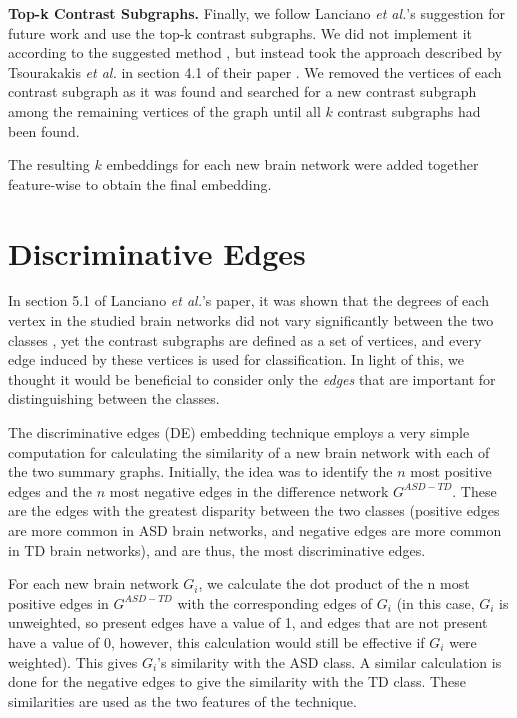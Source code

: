 \documentclass[sigconf]{acmart}
\begin{document}
\textbf{Top-k Contrast Subgraphs.}
Finally, we follow Lanciano \emph{et al.}'s suggestion for future work and use the top-k contrast subgraphs.
We did not implement it according to the suggested method \cite{balalau2015}, but instead took the approach described by Tsourakakis \emph{et al.} in section 4.1 of their paper \cite{tsourakakis2013}.
We removed the vertices of each contrast subgraph as it was found and searched for a new contrast subgraph among the remaining vertices of the graph until all $k$ contrast subgraphs had been found.

The resulting $k$ embeddings for each new brain network were added together feature-wise to obtain the final embedding.



\section{Discriminative Edges}
In section 5.1 of Lanciano \emph{et al.}'s paper, it was shown that the degrees of each vertex in the studied brain networks did not vary significantly between the two classes \cite{lanciano2020}, yet the contrast subgraphs are defined as a set of vertices, and every edge induced by these vertices is used for classification.
In light of this, we thought it would be beneficial to consider only the \emph{edges} that are important for distinguishing between the classes.

The discriminative edges (DE) embedding technique employs a very simple computation for calculating the similarity of a new brain network with each of the two summary graphs.
Initially, the idea was to identify the $n$ most positive edges and the $n$ most negative edges in the difference network $G^{ASD - TD}$.
These are the edges with the greatest disparity between the two classes (positive edges are more common in ASD brain networks, and negative edges are more common in TD brain networks), and are thus, the most discriminative edges.

For each new brain network $G_i$, we calculate the dot product of the n most positive edges in $G^{ASD - TD}$ with the corresponding edges of $G_i$ (in this case, $G_i$ is unweighted, so present edges have a value of 1, and edges that are not present have a value of 0, however, this calculation would still be effective if $G_i$ were weighted).
This gives $G_i$'s similarity with the ASD class.
A similar calculation is done for the negative edges to give the similarity with the TD class.
These similarities are used as the two features of the technique.
\end{document}
